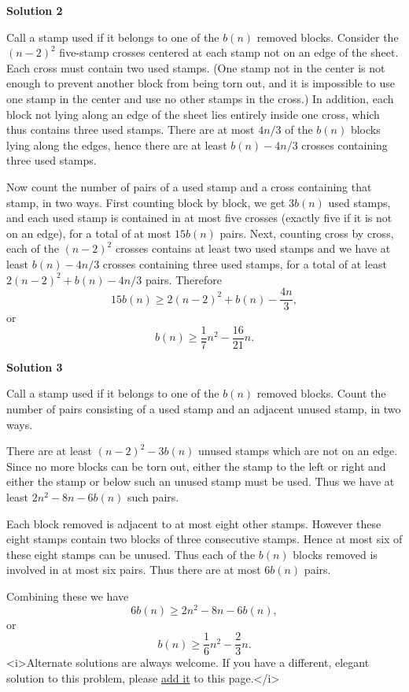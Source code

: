 \begin{enumerate}
\textbf{Solution 2}

Call a stamp used if it belongs to one of the $b(n)$ removed blocks. Consider the $(n - 2)^2$ five-stamp crosses centered at each stamp not on an edge of the sheet. Each cross must contain two used stamps. (One stamp not in the center is not enough to prevent another block from being torn out, and it is impossible to use one stamp in the center and use no other stamps in the cross.) In addition, each block not lying along an edge of the sheet lies entirely inside one cross, which thus contains three used stamps. There are at most $4n/3$ of the $b(n)$ blocks lying along the edges, hence there are at least $b(n) - 4n/3$ crosses containing three used stamps.

 Now count the number of pairs of a used stamp and a cross containing that stamp, in two ways. First counting block by block, we get $3b(n)$ used stamps, and each used stamp is contained in at most five crosses (exactly five if it is not on an edge), for a total of at most $15b(n)$ pairs. Next, counting cross by cross, each of the $(n - 2)^2$ crosses contains at least two used stamps and we have at least $b(n) - 4n/3$ crosses containing three used stamps, for a total of at least $2(n - 2)^2 + b(n) - 4n/3$ pairs. Therefore
 \[15b(n)\geq 2(n - 2)^2 + b(n) - \frac{4n}{3},\]or
 \[b(n)\geq\frac{1}{7}n^2 - \frac{16}{21}n.\]




\textbf{Solution 3}

Call a stamp used if it belongs to one of the $b(n)$ removed blocks. Count the number of pairs consisting of a used stamp and an adjacent unused stamp, in two ways.

 There are at least $(n - 2)^2 - 3b(n)$ unused stamps which are not on an edge. Since no more blocks can be torn out, either the stamp to the left or right and either the stamp or below such an unused stamp must be used. Thus we have at least $2n^2 - 8n - 6b(n)$ such pairs.

 Each block removed is adjacent to at most eight other stamps. However these eight stamps contain two blocks of three consecutive stamps. Hence at most six of these eight stamps can be unused. Thus each of the $b(n)$ blocks removed is involved in at most six pairs. Thus there are at most $6b(n)$ pairs.

 Combining these we have
 \[6b(n)\geq 2n^2 - 8n - 6b(n),\]or
 \[b(n)\geq\frac{1}{6}n^2 - \frac{2}{3}n.\]
<i>Alternate solutions are always welcome. If you have a different, elegant solution to this problem, please \href{https://artofproblemsolving.com/wiki/index.php?title=2002\_USAMO\_Problems/Problem\_6&action=edit}{add it} to this page.</i>



\end{enumerate}